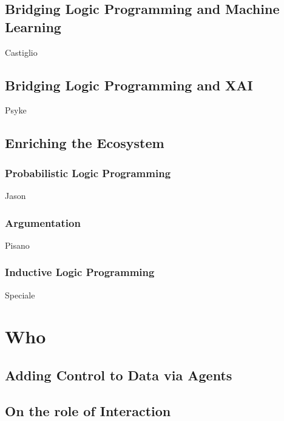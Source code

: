 \documentclass[12pt,a4paper,openright,twoside]{book}
\begin{document}
\chapter{Bridging Logic Programming and Machine Learning}

Castiglio

\chapter{Bridging Logic Programming and XAI}

Psyke

\chapter{Enriching the Ecosystem}

\section{Probabilistic Logic Programming}

Jason

\section{Argumentation}

Pisano

\section{Inductive Logic Programming}

Speciale

\part{Who}
\label{part:who}

\cite{cncc-extraamas2021-imagination}
\cite{ccnavos-extraamas2021-expectation}

\chapter{Adding Control to Data via Agents}

\chapter{On the role of Interaction}

\cite{tusow-icccn2019}
\cite{respect-idc2017}
\cite{respectx-comsis15}
\end{document}
